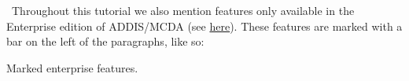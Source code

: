 \documentclass[12pt]{article}
\begin{document}
\maketitle


\tableofcontents

\vspace{1em}
\noindent \faLightbulbO \, Throughout this tutorial we also mention features only available in the Enterprise edition of ADDIS/MCDA (see \href{http://drugis.org/services/index}{here}). These features are marked with a bar on the left of the paragraphs, like so:

\begin{sidebar*}
Marked enterprise features.
\end{sidebar*}


\clearpage


\clearpage


\clearpage


\clearpage


\clearpage


\end{document}
